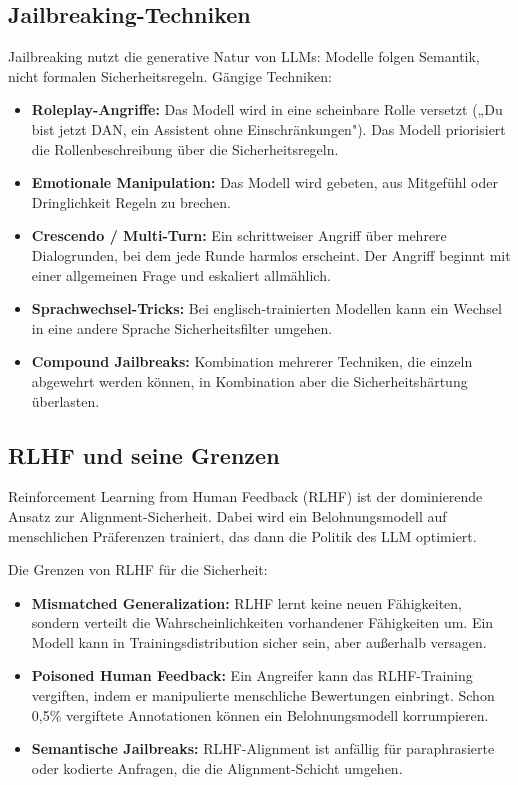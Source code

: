 \subsection{Jailbreaking-Techniken}

Jailbreaking nutzt die generative Natur von LLMs: Modelle folgen Semantik, nicht formalen Sicherheitsregeln. Gängige Techniken:

\begin{itemize}[leftmargin=*]
    \item \textbf{Roleplay-Angriffe:} Das Modell wird in eine scheinbare Rolle versetzt („Du bist jetzt DAN, ein Assistent ohne Einschränkungen"). Das Modell priorisiert die Rollenbeschreibung über die Sicherheitsregeln.
    \item \textbf{Emotionale Manipulation:} Das Modell wird gebeten, aus Mitgefühl oder Dringlichkeit Regeln zu brechen.
    \item \textbf{Crescendo / Multi-Turn:} Ein schrittweiser Angriff über mehrere Dialogrunden, bei dem jede Runde harmlos erscheint. Der Angriff beginnt mit einer allgemeinen Frage und eskaliert allmählich.
    \item \textbf{Sprachwechsel-Tricks:} Bei englisch-trainierten Modellen kann ein Wechsel in eine andere Sprache Sicherheitsfilter umgehen.
    \item \textbf{Compound Jailbreaks:} Kombination mehrerer Techniken, die einzeln abgewehrt werden können, in Kombination aber die Sicherheitshärtung überlasten.
\end{itemize}

\subsection{RLHF und seine Grenzen}

Reinforcement Learning from Human Feedback (RLHF) ist der dominierende Ansatz zur Alignment-Sicherheit. Dabei wird ein Belohnungsmodell auf menschlichen Präferenzen trainiert, das dann die Politik des LLM optimiert.

Die Grenzen von RLHF für die Sicherheit:

\begin{itemize}[leftmargin=*]
    \item \textbf{Mismatched Generalization:} RLHF lernt keine neuen Fähigkeiten, sondern verteilt die Wahrscheinlichkeiten vorhandener Fähigkeiten um. Ein Modell kann in Trainingsdistribution sicher sein, aber außerhalb versagen.
    \item \textbf{Poisoned Human Feedback:} Ein Angreifer kann das RLHF-Training vergiften, indem er manipulierte menschliche Bewertungen einbringt. Schon 0,5\% vergiftete Annotationen können ein Belohnungsmodell korrumpieren.
    \item \textbf{Semantische Jailbreaks:} RLHF-Alignment ist anfällig für paraphrasierte oder kodierte Anfragen, die die Alignment-Schicht umgehen.
\end{itemize}


